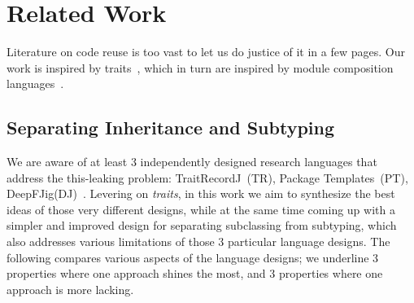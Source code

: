 \saveSpace
\section{Related Work}
\saveSpace
Literature on code reuse is too vast to let us do justice of it in a few pages.
Our work is inspired by traits~\cite{ducasse2006traits}, which in turn
are inspired by module composition languages~\cite{ancona2002calculus}.

\subsection{Separating Inheritance and Subtyping}
We are aware of at least 3 independently designed research languages 
that address the this-leaking problem: TraitRecordJ~(TR)\cite{Bettini:2010:ISP:1774088.1774530,BETTINI2013521,Bettini2015282}, Package Templates~(PT)\cite{KrogdahlMS09,DBLP:journals/taosd/AxelsenSKM12,DBLP:conf/gpce/AxelsenK12}, DeepFJig(DJ)~\cite{deep,servetto2014meta,fjig}.
Levering on \emph{traits}, in this work we aim to synthesize
the best ideas of those very different designs, while at the same time 
coming up with a simpler and improved design for separating
subclassing from subtyping, which also addresses various limitations of those
3 particular language designs.
The following compares 
various aspects of the language designs;
we underline 3 properties where one approach shines the most, and 3 properties where one approach is more lacking.
